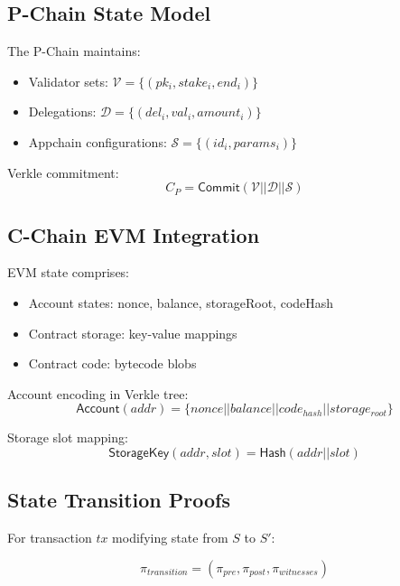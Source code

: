 \documentclass[11pt,a4paper]{article}
\theoremstyle{definition}
\begin{document}
\subsection{P-Chain State Model}

The P-Chain maintains:
\begin{itemize}
    \item Validator sets: $\mathcal{V} = \{(pk_i, stake_i, end_i)\}$
    \item Delegations: $\mathcal{D} = \{(del_i, val_i, amount_i)\}$
    \item Appchain configurations: $\mathcal{S} = \{(id_i, params_i)\}$
\end{itemize}

Verkle commitment:
\begin{equation}
    C_{P} = \mathsf{Commit}(\mathcal{V} || \mathcal{D} || \mathcal{S})
\end{equation}

\subsection{C-Chain EVM Integration}

EVM state comprises:
\begin{itemize}
    \item Account states: nonce, balance, storageRoot, codeHash
    \item Contract storage: key-value mappings
    \item Contract code: bytecode blobs
\end{itemize}

Account encoding in Verkle tree:
\begin{equation}
    \mathsf{Account}(addr) = \{nonce || balance || code_{hash} || storage_{root}\}
\end{equation}

Storage slot mapping:
\begin{equation}
    \mathsf{StorageKey}(addr, slot) = \mathsf{Hash}(addr || slot)
\end{equation}

\subsection{State Transition Proofs}

For transaction $tx$ modifying state from $S$ to $S'$:

\begin{equation}
    \pi_{transition} = (\pi_{pre}, \pi_{post}, \pi_{witnesses})
\end{equation}
\end{document}
